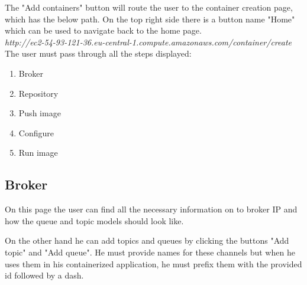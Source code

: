 The "Add containers" button will route the user to the container creation page, which has the below path. On the top right side there is a button name "Home" which can be used to navigate back to the home page.\\

\textit{http://ec2-54-93-121-36.eu-central-1.compute.amazonaws.com/container/create}\\

The user must pass through all the steps displayed:

\begin{enumerate}
	\item Broker
	\item Repository
	\item Push image
	\item Configure
	\item Run image
\end{enumerate}

\newpage

\subsection{Broker}
\label{chap:05:01:01}

On this page the user can find all the necessary information on to broker IP and how the queue and topic models should look like.

On the other hand he can add topics and queues by clicking the buttons "Add topic" and "Add queue". He must provide names for these channels but when he uses them in his containerized application, he must prefix them with the provided id followed by a dash.\\

